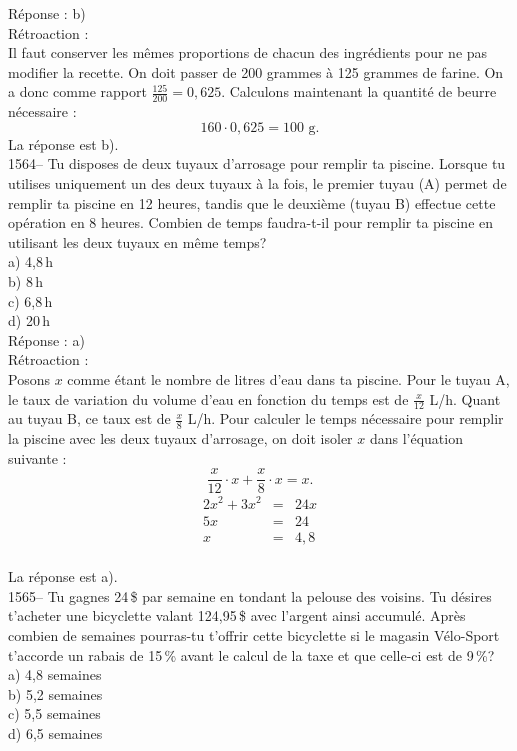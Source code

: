 R\'eponse : b)\\

R\'etroaction :\\
Il faut conserver les m\^emes proportions de chacun des
ingr\'edients pour ne pas modifier la recette. On doit passer de 200
grammes \`a 125 grammes de farine. On a donc comme rapport
$\frac{125}{200}=0,625$. Calculons maintenant la quantit\'e de
beurre n\'ecessaire : $$160\cdot0,625={\textrm{100 g.}}$$ La r\'eponse est
b).\\

1564-- Tu disposes de deux tuyaux d'arrosage pour remplir ta piscine.
Lorsque tu utilises uniquement un des deux tuyaux \`a la fois, le
premier tuyau (A) permet de remplir ta piscine en 12 heures, tandis
que le deuxi\`eme (tuyau B) effectue cette op\'eration en 8 heures.
Combien de temps faudra-t-il pour remplir ta piscine en utilisant
les deux tuyaux en m\^eme temps?\\
a) 4,8\,h\\
b) 8\,h\\
c) 6,8\,h\\
d) 20\,h\\

R\'eponse : a)\\

R\'etroaction :\\
Posons $x$ comme \'etant le nombre de litres d'eau dans ta piscine.
Pour le tuyau A, le taux de variation du volume d'eau en fonction du
temps est de $\frac{x}{12}$ L/h. Quant au tuyau B, ce taux est de
$\frac{x}{8}$ L/h. Pour calculer le temps n\'ecessaire pour
remplir la piscine avec les deux tuyaux d'arrosage, on doit isoler
$x$ dans l'\'equation suivante :$$\frac{x}{12}\cdot
x+\frac{x}{8}\cdot x=x.$$
\begin{eqnarray*}
2x^2+3x^2&=&24x \\ 5x&=&24 \\ x&=&4,8
\end{eqnarray*}\\
La r\'eponse est a).\\

1565-- Tu gagnes 24\,\$ par semaine en tondant la pelouse des
voisins. Tu d\'esires t'acheter une bicyclette valant 124,95\,\$
avec l'argent ainsi accumul\'e. Apr\`es combien de semaines
pourras-tu t'offrir cette bicyclette si le magasin V\'elo-Sport
t'accorde un rabais de 15\,\%
avant le calcul de la taxe et que celle-ci est de 9\,\%?\\
a) 4,8 semaines\\
b) 5,2 semaines \\
c) 5,5 semaines\\
d) 6,5 semaines\\

